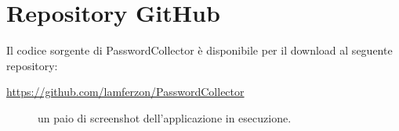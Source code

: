 \documentclass[a4paper, 12pt, one column, aas_macros]{article}
\begin{document}
	\section{Repository GitHub}
	Il codice sorgente di PasswordCollector è disponibile per il download al seguente repository:
	\begin{center}
		\url{https://github.com/lamferzon/PasswordCollector}
	\end{center}
	\begin{figure}[h!]
		\centering
		\caption[]{un paio di screenshot dell'applicazione in esecuzione.}
		\label{App_screens}
	\end{figure}
	
\end{document}
